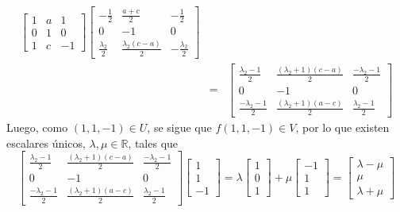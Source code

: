 \begin{solucion}
\begin{enumerate}[$a$)]
\begin{eqnarray*}
   \begin{bmatrix}
    1 & a &  1 \\
    0 & 1 &  0 \\
    1 & c & -1
   \end{bmatrix}
   \begin{bmatrix}
    -\frac{1}{2} & \frac{a+c}{2} & -\frac{1}{2} \\
    0 & -1 & 0 \\
    \frac{\lambda_2}{2} & \frac{\lambda_2(c-a)}{2} & -\frac{\lambda_2}{2}
   \end{bmatrix} \\
   & = & 
   \begin{bmatrix}
    \frac{\lambda_2 - 1}{2} & \frac{(\lambda_2+1)(c-a)}{2} & \frac{-\lambda_2-1}{2} \\
    0 & -1 & 0 \\
    \frac{-\lambda_2-1}{2} & \frac{(\lambda_2+1)(a-c)}{2} & \frac{\lambda_2 - 1}{2}
   \end{bmatrix}
  \end{eqnarray*}
  Luego, como $(1,1,-1) \in U$, se sigue que $f(1,1,-1) \in V$, por lo que existen escalares \'unicos, $\lambda, \mu \in \mathbb{R}$, tales que
  \begin{equation*} 
   \begin{bmatrix}
    \frac{\lambda_2 - 1}{2} & \frac{(\lambda_2+1)(c-a)}{2} & \frac{-\lambda_2-1}{2} \\
    0 & -1 & 0 \\
    \frac{-\lambda_2-1}{2} & \frac{(\lambda_2+1)(a-c)}{2} & \frac{\lambda_2 - 1}{2}
   \end{bmatrix}
   \begin{bmatrix}
    1 \\ 1 \\ -1
   \end{bmatrix}
   = 
   \lambda
   \begin{bmatrix}
    1 \\ 0 \\ 1
   \end{bmatrix}
   +
   \mu
   \begin{bmatrix}
    -1 \\ 1 \\ 1
   \end{bmatrix}
   =
   \begin{bmatrix}
    \lambda - \mu \\
    \mu \\ 
    \lambda + \mu
   \end{bmatrix}
  \end{equation*}

\end{enumerate}
\end{solucion}
